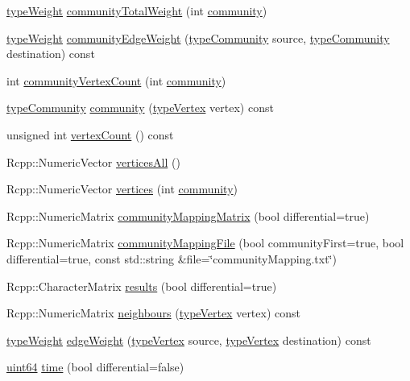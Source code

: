 \begin{DoxyCompactItemize}
\item 
\hyperlink{edge_8h_a2e7ea3be891ac8b52f749ec73fee6dd2}{type\+Weight} \hyperlink{classDynCommRcpp_a687e7be3ae84f1a80a3648435bd473a3}{community\+Total\+Weight} (int \hyperlink{classDynCommRcpp_ac3c8c1759d2ab106b757557e09834ec5}{community})
\item 
\hyperlink{edge_8h_a2e7ea3be891ac8b52f749ec73fee6dd2}{type\+Weight} \hyperlink{classDynCommRcpp_ad74a2abe244e62d9df2b98aeea0d3155}{community\+Edge\+Weight} (\hyperlink{graphUndirectedGroupable_8h_a914da95c9ea7f14f4b7f875c36818556}{type\+Community} source, \hyperlink{graphUndirectedGroupable_8h_a914da95c9ea7f14f4b7f875c36818556}{type\+Community} destination) const
\item 
int \hyperlink{classDynCommRcpp_ab856335d737d2292df6f86e9cf199d58}{community\+Vertex\+Count} (int \hyperlink{classDynCommRcpp_ac3c8c1759d2ab106b757557e09834ec5}{community})
\item 
\hyperlink{graphUndirectedGroupable_8h_a914da95c9ea7f14f4b7f875c36818556}{type\+Community} \hyperlink{classDynCommRcpp_ac3c8c1759d2ab106b757557e09834ec5}{community} (\hyperlink{edge_8h_a5fbd20c46956d479cb10afc9855223f6}{type\+Vertex} vertex) const
\item 
unsigned int \hyperlink{classDynCommRcpp_af7bc0e9dc9a2c1e232b3e28b63388629}{vertex\+Count} () const
\item 
Rcpp\+::\+Numeric\+Vector \hyperlink{classDynCommRcpp_aa2aa3fe8c7af4239bd9b3c6a669329ec}{vertices\+All} ()
\item 
Rcpp\+::\+Numeric\+Vector \hyperlink{classDynCommRcpp_ad849d8e27c9f8aec2f6cdf89b06b9be4}{vertices} (int \hyperlink{classDynCommRcpp_ac3c8c1759d2ab106b757557e09834ec5}{community})
\item 
Rcpp\+::\+Numeric\+Matrix \hyperlink{classDynCommRcpp_aaa996ab5e558887d3bc5394af78a2e95}{community\+Mapping\+Matrix} (bool differential=true)
\item 
Rcpp\+::\+Numeric\+Matrix \hyperlink{classDynCommRcpp_a132aff4ca6f76fd006b2faccbfd01e04}{community\+Mapping\+File} (bool community\+First=true, bool differential=true, const std\+::string \&file=\char`\"{}community\+Mapping.\+txt\char`\"{})
\item 
Rcpp\+::\+Character\+Matrix \hyperlink{classDynCommRcpp_a4120d9f0232611e4ecb497eaf6e4706a}{results} (bool differential=true)
\item 
Rcpp\+::\+Numeric\+Matrix \hyperlink{classDynCommRcpp_abbda8cc950c360c1b89859ebe9233535}{neighbours} (\hyperlink{edge_8h_a5fbd20c46956d479cb10afc9855223f6}{type\+Vertex} vertex) const
\item 
\hyperlink{edge_8h_a2e7ea3be891ac8b52f749ec73fee6dd2}{type\+Weight} \hyperlink{classDynCommRcpp_a9a9aaf2512541f308d935e48c583f410}{edge\+Weight} (\hyperlink{edge_8h_a5fbd20c46956d479cb10afc9855223f6}{type\+Vertex} source, \hyperlink{edge_8h_a5fbd20c46956d479cb10afc9855223f6}{type\+Vertex} destination) const
\item 
\hyperlink{systemDefines_8h_abc0f5bc07737e498f287334775dff2b6}{uint64} \hyperlink{classDynCommRcpp_a89773080b66fd210a7e22234ba04a19f}{time} (bool differential=false)
\end{DoxyCompactItemize}
